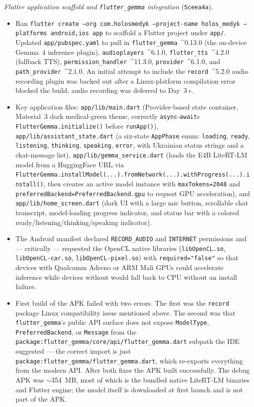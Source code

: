 \documentclass{article}
\theoremstyle{plain}
\theoremstyle{definition}
\theoremstyle{remark}
\begin{document}
\textit{Flutter application scaffold and \texttt{flutter\_gemma} integration} (\texttt{5ceea4a}).
\begin{itemize}
\item Ran \texttt{flutter create --org com.holosmedyk --project-name holos\_medyk --platforms android,ios app} to scaffold a Flutter project under \texttt{app/}. Updated \texttt{app/pubspec.yaml} to pull in \texttt{flutter\_gemma}~\^{}0.13.0 (the on-device Gemma~4 inference plugin), \texttt{audioplayers}~\^{}6.1.0, \texttt{flutter\_tts}~\^{}4.2.0 (fallback TTS), \texttt{permission\_handler}~\^{}11.3.0, \texttt{provider}~\^{}6.1.0, and \texttt{path\_provider}~\^{}2.1.0. An initial attempt to include the \texttt{record}~\^{}5.2.0 audio recording plugin was backed out after a Linux-platform compilation error blocked the build; audio recording was deferred to Day~3+.
\item Key application files: \texttt{app/lib/main.dart} (Provider-based state container, Material~3 dark medical-green theme, correctly \texttt{async}-\texttt{await}s \texttt{FlutterGemma.initialize()} before \texttt{runApp()}), \texttt{app/lib/assistant\_state.dart} (a six-state \texttt{AppPhase} enum: \texttt{loading}, \texttt{ready}, \texttt{listening}, \texttt{thinking}, \texttt{speaking}, \texttt{error}, with Ukrainian status strings and a chat-message list), \texttt{app/lib/gemma\_service.dart} (loads the E4B LiteRT-LM model from a HuggingFace URL via \texttt{FlutterGemma.installModel(...).fromNetwork(...).withProgress(...).install()}, then creates an active model instance with \texttt{maxTokens=2048} and \texttt{preferredBackend=PreferredBackend.gpu} to request GPU acceleration), and \texttt{app/lib/home\_screen.dart} (dark UI with a large mic button, scrollable chat transcript, model-loading progress indicator, and status bar with a colored ready/listening/thinking/speaking indicator).
\item The Android manifest declared \texttt{RECORD\_AUDIO} and \texttt{INTERNET} permissions and --- critically --- requested the OpenCL native libraries (\texttt{libOpenCL.so}, \texttt{libOpenCL-car.so}, \texttt{libOpenCL-pixel.so}) with \texttt{required="false"} so that devices with Qualcomm Adreno or ARM Mali GPUs could accelerate inference while devices without would fall back to CPU without an install failure.
\item First build of the APK failed with two errors. The first was the \texttt{record} package Linux compatibility issue mentioned above. The second was that \texttt{flutter\_gemma}'s public API surface does not expose \texttt{ModelType}, \texttt{PreferredBackend}, or \texttt{Message} from the \texttt{package:flutter\_gemma/core/api/flutter\_gemma.dart} subpath the IDE suggested --- the correct import is just \texttt{package:flutter\_gemma/flutter\_gemma.dart}, which re-exports everything from the modern API. After both fixes the APK built successfully. The debug APK was $\sim$354~MB, most of which is the bundled native LiteRT-LM binaries and Flutter engine; the model itself is downloaded at first launch and is not part of the APK.
\end{itemize}
\end{document}
